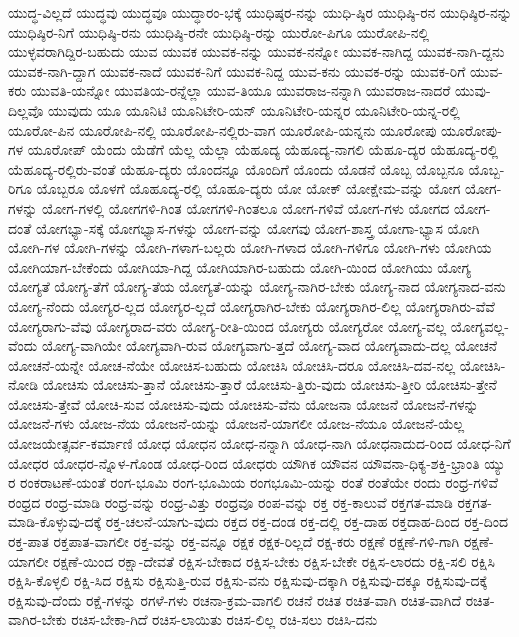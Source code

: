 {ಯುದ್ಧ-ವಿಲ್ಲದೆ
ಯುದ್ಧವು
ಯುದ್ಧವೂ
ಯುದ್ಧಾರಂ-ಭಕ್ಕೆ
ಯುಧಿಷ್ಠರ-ನನ್ನು
ಯುಧಿ-ಷ್ಠಿರ
ಯುಧಿಷ್ಠಿ-ರನ
ಯುಧಿಷ್ಠಿರ-ನನ್ನು
ಯುಧಿಷ್ಠಿರ-ನಿಗೆ
ಯುಧಿಷ್ಠಿ-ರನು
ಯುಧಿಷ್ಠಿ-ರನೇ
ಯುಧಿಷ್ಠಿ-ರನ್ನು
ಯುರೋ-ಪಿಗೂ
ಯುರೋಪಿ-ನಲ್ಲಿ
ಯುಳ್ಳವರಾಗಿದ್ದಿರ-ಬಹುದು
ಯುವ
ಯುವಕ
ಯುವಕ-ನನ್ನು
ಯುವಕ-ನನ್ನೋ
ಯುವಕ-ನಾಗಿದ್ದ
ಯುವಕ-ನಾಗಿ-ದ್ದನು
ಯುವಕ-ನಾಗಿ-ದ್ದಾಗ
ಯುವಕ-ನಾದೆ
ಯುವಕ-ನಿಗೆ
ಯುವಕ-ನಿದ್ದ
ಯುವ-ಕನು
ಯುವಕ-ರನ್ನು
ಯುವಕ-ರಿಗೆ
ಯುವ-ಕರು
ಯುವತಿ-ಯನ್ನೋ
ಯುವತಿಯ-ರನ್ನೆಲ್ಲಾ
ಯುವ-ತಿಯೂ
ಯುವರಾಜ-ನನ್ನಾಗಿ
ಯುವರಾಜ-ನಾದರೆ
ಯುವು-ದಿಲ್ಲವೊ
ಯುವುದು
ಯೂ
ಯೂನಿಟಿ
ಯೂನಿಟೇರಿ-ಯನ್
ಯೂನಿಟೇರಿ-ಯನ್ನರ
ಯೂನಿಟೇರಿ-ಯನ್ನ-ರಲ್ಲಿ
ಯೂರೋ-ಪಿನ
ಯೂರೋಪಿ-ನಲ್ಲಿ
ಯೂರೋಪಿ-ನಲ್ಲಿರು-ವಾಗ
ಯೂರೋಪಿ-ಯನ್ನನು
ಯೂರೋಪು
ಯೂರೋಪು-ಗಳ
ಯೂರೋಪ್
ಯೆಂದು
ಯೆಡೆಗೆ
ಯೆಲ್ಲ
ಯೆಲ್ಲಾ
ಯೆಹೂದ್ಯ
ಯೆಹೂದ್ಯ-ನಾಗಲಿ
ಯೆಹೂ-ದ್ಯರ
ಯೆಹೂದ್ಯ-ರಲ್ಲಿ
ಯೆಹೂದ್ಯ-ರಲ್ಲಿರು-ವಂತೆ
ಯೆಹೂ-ದ್ಯರು
ಯೊಂದನ್ನೂ
ಯೊಂದಿಗೆ
ಯೊಂದು
ಯೊಡನೆ
ಯೊಬ್ಬ
ಯೊಬ್ಬನೂ
ಯೊಬ್ಬ-ರಿಗೂ
ಯೊಬ್ಬರೂ
ಯೊಳಗೆ
ಯೊಹೂದ್ಯ-ರಲ್ಲಿ
ಯೊಹೂ-ದ್ಯರು
ಯೋ
ಯೋಕ್
ಯೋಕ್ಷೇಮ-ವನ್ನು
ಯೋಗ
ಯೋಗ-ಗಳನ್ನು
ಯೋಗ-ಗಳಲ್ಲಿ
ಯೋಗಗಳಿ-ಗಿಂತ
ಯೋಗಗಳಿ-ಗಿಂತಲೂ
ಯೋಗ-ಗಳಿವೆ
ಯೋಗ-ಗಳು
ಯೋಗದ
ಯೋಗ-ದಂತೆ
ಯೋಗಭ್ಯಾ-ಸಕ್ಕೆ
ಯೋಗಭ್ಯಾಸ-ಗಳನ್ನು
ಯೋಗ-ವನ್ನು
ಯೋಗವು
ಯೋಗ-ಶಾಸ್ತ್ರ
ಯೋಗಾ-ಭ್ಯಾಸ
ಯೋಗಿ
ಯೋಗಿ-ಗಳ
ಯೋಗಿ-ಗಳನ್ನು
ಯೋಗಿ-ಗಳಾಗ-ಬಲ್ಲರು
ಯೋಗಿ-ಗಳಾದ
ಯೋಗಿ-ಗಳಿಗೂ
ಯೋಗಿ-ಗಳು
ಯೋಗಿಯ
ಯೋಗಿಯಾಗ-ಬೇಕೆಂದು
ಯೋಗಿಯಾ-ಗಿದ್ದ
ಯೋಗಿಯಾಗಿರ-ಬಹುದು
ಯೋಗಿ-ಯಿಂದ
ಯೋಗಿಯು
ಯೋಗ್ಯ
ಯೋಗ್ಯತೆ
ಯೋಗ್ಯ-ತೆಗೆ
ಯೋಗ್ಯ-ತೆಯ
ಯೋಗ್ಯತೆ-ಯನ್ನು
ಯೋಗ್ಯ-ನಾಗಿರ-ಬೇಕು
ಯೋಗ್ಯ-ನಾದ
ಯೋಗ್ಯನಾದ-ವನು
ಯೋಗ್ಯ-ನೆಂದು
ಯೋಗ್ಯರ-ಲ್ಲದ
ಯೋಗ್ಯರ-ಲ್ಲದೆ
ಯೋಗ್ಯರಾಗಿರ-ಬೇಕು
ಯೋಗ್ಯರಾಗಿರ-ಲಿಲ್ಲ
ಯೋಗ್ಯರಾಗಿರು-ವೆವೆ
ಯೋಗ್ಯರಾಗು-ವೆವು
ಯೋಗ್ಯರಾದ-ವರು
ಯೋಗ್ಯ-ರೀತಿ-ಯಿಂದ
ಯೋಗ್ಯರು
ಯೋಗ್ಯರೋ
ಯೋಗ್ಯ-ವಲ್ಲ
ಯೋಗ್ಯವಲ್ಲ-ವೆಂದು
ಯೋಗ್ಯ-ವಾಗಿಯೇ
ಯೋಗ್ಯವಾಗಿ-ರುವ
ಯೋಗ್ಯವಾಗು-ತ್ತದೆ
ಯೋಗ್ಯ-ವಾದ
ಯೋಗ್ಯವಾದು-ದಲ್ಲ
ಯೋಚನೆ
ಯೋಚನೆ-ಯನ್ನೇ
ಯೋಚ-ನೆಯೇ
ಯೋಚಿಸ-ಬಹುದು
ಯೋಚಿಸಿ
ಯೋಚಿಸಿ-ದರೂ
ಯೋಚಿಸಿ-ದವ-ನಲ್ಲ
ಯೋಚಿಸಿ-ನೋಡಿ
ಯೋಚಿಸು
ಯೋಚಿಸು-ತ್ತಾನೆ
ಯೋಚಿಸು-ತ್ತಾರೆ
ಯೋಚಿಸು-ತ್ತಿರು-ವುದು
ಯೋಚಿಸು-ತ್ತೀರಿ
ಯೋಚಿಸು-ತ್ತೇನೆ
ಯೋಚಿಸು-ತ್ತೇವೆ
ಯೋಚಿ-ಸುವ
ಯೋಚಿಸು-ವುದು
ಯೋಚಿಸು-ವೆನು
ಯೋಜನಾ
ಯೋಜನೆ
ಯೋಜನೆ-ಗಳನ್ನು
ಯೋಜನೆ-ಗಳು
ಯೋಜ-ನೆಯ
ಯೋಜನೆ-ಯನ್ನು
ಯೋಜನೆ-ಯಾಗಲೀ
ಯೋಜ-ನೆಯೂ
ಯೋಜನೆ-ಯೆಲ್ಲ
ಯೋಜಯೇತ್ಸರ್ವ-ಕರ್ಮಾಣಿ
ಯೋಧ
ಯೋಧನ
ಯೋಧ-ನನ್ನಾಗಿ
ಯೋಧ-ನಾಗಿ
ಯೋಧನಾದುದ-ರಿಂದ
ಯೋಧ-ನಿಗೆ
ಯೋಧರ
ಯೋಧರ-ನ್ನೊಳ-ಗೊಂಡ
ಯೋಧ-ರಿಂದ
ಯೋಧರು
ಯೌಗಿಕ
ಯೌವನ
ಯೌವನಾ-ಧಿಕ್ಯ-ಶಕ್ತಿ-ಭ್ರಾಂತಿ
ಯ್ಯು
ರ
ರಂಕರಾಟಣೆ-ಯಂತೆ
ರಂಗ-ಭೂಮಿ
ರಂಗ-ಭೂಮಿಯ
ರಂಗಭೂಮಿ-ಯನ್ನು
ರಂತೆ
ರಂತೆಯೇ
ರಂದು
ರಂಧ್ರ-ಗಳಿವೆ
ರಂಧ್ರದ
ರಂಧ್ರ-ಮಾಡಿ
ರಂಧ್ರ-ವನ್ನು
ರಂಧ್ರ-ವಿತ್ತು
ರಂಧ್ರವೂ
ರಂಪ-ವನ್ನು
ರಕ್ತ
ರಕ್ತ-ಕಾಲುವೆ
ರಕ್ತಗತ-ಮಾಡಿ
ರಕ್ತಗತ-ಮಾಡಿ-ಕೊಳ್ಳುವು-ದಕ್ಕೆ
ರಕ್ತ-ಚಲನೆ-ಯಾಗು-ವುದು
ರಕ್ತದ
ರಕ್ತ-ದಂಡ
ರಕ್ತ-ದಲ್ಲಿ
ರಕ್ತ-ದಾಹ
ರಕ್ತದಾಹ-ದಿಂದ
ರಕ್ತ-ದಿಂದ
ರಕ್ತ-ಪಾತ
ರಕ್ತಪಾತ-ವಾಗಲೀ
ರಕ್ತ-ವನ್ನು
ರಕ್ತ-ವನ್ನೂ
ರಕ್ಷಕ
ರಕ್ಷಕ-ರಿಲ್ಲದೆ
ರಕ್ಷ-ಕರು
ರಕ್ಷಣೆ
ರಕ್ಷಣೆ-ಗಳಿ-ಗಾಗಿ
ರಕ್ಷಣೆ-ಯಾಗಲೀ
ರಕ್ಷಣೆ-ಯಿಂದ
ರಕ್ಷಾ-ದೇವತೆ
ರಕ್ಷಿಸ-ಬೇಕಾದ
ರಕ್ಷಿಸ-ಬೇಕು
ರಕ್ಷಿಸ-ಬೇಕೇ
ರಕ್ಷಿಸ-ಲಾರದು
ರಕ್ಷಿ-ಸಲಿ
ರಕ್ಷಿಸಿ
ರಕ್ಷಿಸಿ-ಕೊಳ್ಳಲಿ
ರಕ್ಷಿ-ಸಿದ
ರಕ್ಷಿಸು
ರಕ್ಷಿಸುತ್ತಿ-ರುವ
ರಕ್ಷಿಸು-ವನು
ರಕ್ಷಿಸುವು-ದಕ್ಕಾಗಿ
ರಕ್ಷಿಸುವು-ದಕ್ಕೂ
ರಕ್ಷಿಸುವು-ದಕ್ಕೆ
ರಕ್ಷಿಸುವು-ದೆಂದು
ರಕ್ಷೆ-ಗಳನ್ನು
ರಗಳೆ-ಗಳು
ರಚನಾ-ಕ್ರಮ-ವಾಗಲಿ
ರಚನೆ
ರಚಿತ
ರಚಿತ-ವಾಗಿ
ರಚಿತ-ವಾಗಿದೆ
ರಚಿತ-ವಾಗಿರ-ಬೇಕು
ರಚಿಸ-ಬೇಕಾ-ಗಿದೆ
ರಚಿಸ-ಲಾಯಿತು
ರಚಿಸ-ಲಿಲ್ಲ
ರಚಿ-ಸಲು
ರಚಿಸಿ-ದನು
}
